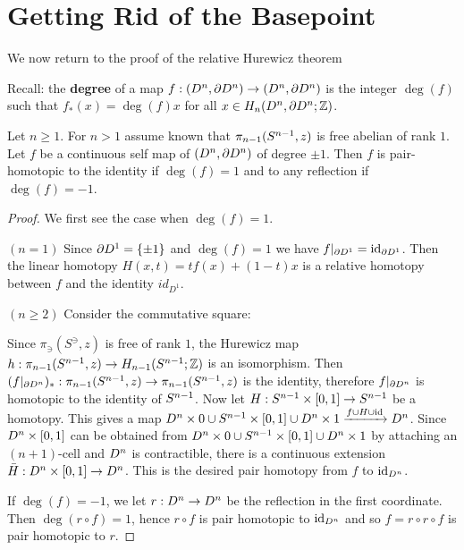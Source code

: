 \section{Getting Rid of the Basepoint}

We now return to the proof of the relative Hurewicz theorem

Recall: the \textbf{degree} of a map $f:(D^n,\partial D^n)\to(D^n,\partial D^n)$ is the integer $\deg(f)$ such that $f_*(x)=\deg(f)x$ for all $x\in H_n(D^n,\partial D^n;{\mathbb Z})$.

\begin{lemma}\label{lemma:degree-of-sphere-self-maps}
Let $n\geq1$. For $n>1$ assume known that $\pi_{n-1}(S^{n-1},z)$ is free abelian of rank $1$. Let $f$ be a continuous self map of $(D^n,\partial D^n)$ of degree $\pm 1$. Then $f$ is pair-homotopic to the identity if $\deg(f)=1$ and to any reflection if $\deg(f)=-1$.
\end{lemma}

\begin{proof}
We first see the case when $\deg(f)=1$.

$(n=1)$ Since $\partial D^1=\{\pm1\}$ and $\deg(f)=1$ we have $f|_{\partial D^1}=\operatorname{id}_{\partial D^1}$. Then the linear homotopy $H(x,t)=tf(x)+(1-t)x$ is a relative homotopy between $f$ and the identity $id_{D^1}$.

$(n\geq2)$ Consider the commutative square:
\begin{center}
\end{center}
Since $\pi_\ni(S^\ni,z)$ is free of rank $1$, the Hurewicz map $h:\pi_{n-1}(S^{n-1},z)\to H_{n-1}(S^{n-1};{\mathbb Z})$ is an isomorphism. Then $(f|_{\partial D^n})_*:\pi_{n-1}(S^{n-1},z)\to\pi_{n-1}(S^{n-1},z)$ is the identity, therefore $f|_{\partial D^n}$ is homotopic to the identity of $S^{n-1}$. Now let $H:S^{n-1}\times [0,1]\to S^{n-1}$ be a homotopy. This gives a map $D^n\times0\cup S^{n-1}\times[0,1]\cup D^n\times1\xrightarrow{f\cup H\cup\operatorname{id}}D^n$. Since $D^n\times[0,1]$ can be obtained from $D^n\times0\cup S^{n-1}\times[0,1]\cup D^n\times1$ by attaching an $(n+1)$-cell and $D^n$ is contractible\normalmarginpar{}, there is a continuous extension $\bar{H}:D^n\times[0,1]\to D^n$. This is the desired pair homotopy from $f$ to $\operatorname{id}_{D^n}$.

If $\deg(f)=-1$, we let $r:D^n\to D^n$ be the reflection in the first coordinate. Then $\deg(r\circ f)=1$, hence $r\circ f$ is pair homotopic to $\operatorname{id}_{D^n}$ and so $f=r\circ r\circ f$ is pair homotopic to $r$.
\end{proof}

